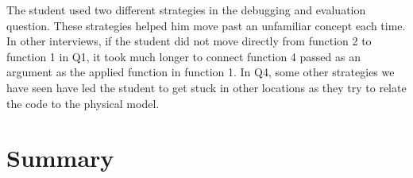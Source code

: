 \documentclass{article}
\begin{document}
The student used two different strategies in the debugging and evaluation question.
These strategies helped him move past an unfamiliar concept each time. 
In other interviews, if the student did not move directly from function 2 to function 1 in Q1, it took much longer to connect function 4 passed as an argument as the applied function in function 1.
In Q4, some other strategies we have seen have led the student to get stuck in other locations as they try to relate the code to the physical model. 







\section{Summary}
\end{document}
